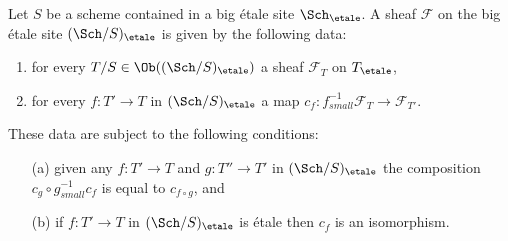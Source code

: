 \begin{lemma}
\label{lemma-characterize-sheaf-big-etale}
Let $S$ be a scheme contained in a big \'etale site
$\Sch_\etale$.
A sheaf $\mathcal{F}$ on the big \'etale site
$(\Sch/S)_\etale$ is given by the following data:
\begin{enumerate}
\item for every $T/S \in \Ob((\Sch/S)_\etale)$ a sheaf
$\mathcal{F}_T$ on $T_\etale$,
\item for every $f : T' \to T$ in
$(\Sch/S)_\etale$ a map
$c_f : f_{small}^{-1}\mathcal{F}_T \to \mathcal{F}_{T'}$.
\end{enumerate}
These data are subject to the following conditions:
\begin{enumerate}
\item[(a)] given any $f : T' \to T$ and $g : T'' \to T'$ in
$(\Sch/S)_\etale$ the composition
$c_g \circ g_{small}^{-1}c_f$ is equal to $c_{f \circ g}$, and
\item[(b)] if $f : T' \to T$ in $(\Sch/S)_\etale$
is \'etale then $c_f$ is an isomorphism.
\end{enumerate}
\end{lemma}

